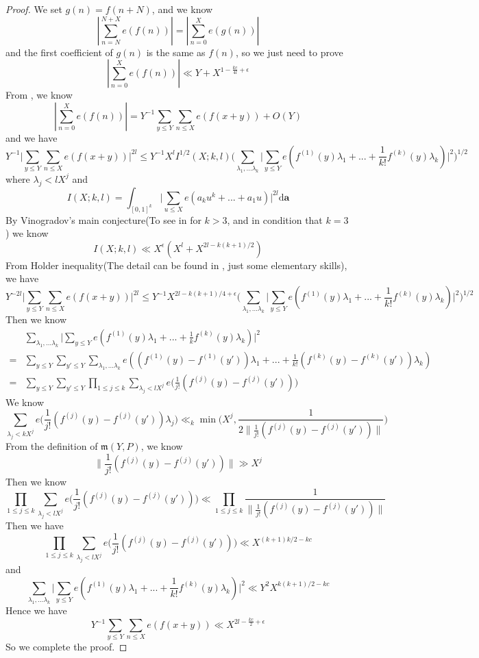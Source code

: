 \documentclass[10pt,a4paper]{amsart}
\begin{document}
\begin{proof}
We set $g(n)=f(n+N)$, and we know
\[
|\sum\limits_{n=N}^{N+X}e(f(n))|=|\sum\limits_{n=0}^{X}e(g(n))|
\]
and the first coefficient of $g(n)$ is the same as $f(n)$, so we just need to prove
\[
|\sum\limits_{n=0}^{X}e(f(n))|\ll Y+X^{1-\frac{kc}{4l}+\epsilon}
\]
From \cite{PP1986}, we know 
\[
|\sum\limits_{n=0}^{X}e(f(n))|=Y^{-1}\sum\limits_{y\leq Y}\sum\limits_{n\leq X}e(f(x+y))+O(Y)
\]
and we have
\[
Y^{-1}\Big|\sum\limits_{y\leq Y}\sum\limits_{n\leq X}e(f(x+y))\Big|^{2l}\leq Y^{-1}X^lI^{1/2}(X;k,l)\Big(\sum\limits_{\lambda_1,...\lambda_k}\big|\sum\limits_{y\leq Y}e(f^{(1)}(y)\lambda_1+...+\frac{1}{k!}f^{(k)}(y)\lambda_k)\big|^2\Big)^{1/2}
\]
where $\lambda_j<lX^j$ and
\[
I(X;k,l)=\int_{[0,1]^k}\bigg|\sum\limits_{u\leq X}e(a_ku^k+...+a_1u)\bigg|^{2l}\mathrm{d}\textbf{a}
\]
By Vinogradov's main conjecture(To see in \cite{bourgain2016proofmainconjecturevinogradovs} for $k>3$, and \cite{wooley2014cubiccasemainconjecture} in condition that $k=3$) we know
\[
I(X;k,l)\ll X^{\epsilon}(X^{l}+X^{2l-k(k+1)/2})
\]
From Holder inequality(The detail can be found in \cite{PP1986}, just some elementary skills), we have
\[
Y^{-2l}\Big|\sum\limits_{y\leq Y}\sum\limits_{n\leq X}e(f(x+y))\Big|^{2l}\leq Y^{-1}X^{2l-k(k+1)/4+\epsilon}\Big(\sum\limits_{\lambda_1,...\lambda_k}\big|\sum\limits_{y\leq Y}e(f^{(1)}(y)\lambda_1+...+\frac{1}{k!}f^{(k)}(y)\lambda_k)\big|^2\Big)^{1/2}
\]
Then we know
\begin{align*}
&\sum\limits_{\lambda_1,...\lambda_k}\big|\sum\limits_{y\leq Y}e(f^{(1)}(y)\lambda_1+...+\frac{1}{k}f^{(k)}(y)\lambda_k)\big|^2\\
=&\sum\limits_{y\leq Y}\sum\limits_{y'\leq Y}\sum\limits_{\lambda_1,...\lambda_k}e((f^{(1)}(y)-f^{(1)}(y'))\lambda_1+...+\frac{1}{k!}(f^{(k)}(y)-f^{(k)}(y'))\lambda_k)\\
=&\sum\limits_{y\leq Y}\sum\limits_{y'\leq Y}\prod\limits_{1\leq j\leq k}\sum\limits_{\lambda_j<lX^j}e\big(\frac{1}{j!}(f^{(j)}(y)-f^{(j)}(y'))\big)
\end{align*}
We know
\[
\sum\limits_{\lambda_j<kX^j}e\big(\frac{1}{j!}(f^{(j)}(y)-f^{(j)}(y'))\lambda_j\big)\ll_k\min\bigg(X^j,\frac{1}{2\|\frac{1}{j!}(f^{(j)}(y)-f^{(j)}(y'))\|}\bigg)
\]
From the definition of $\mathfrak{m}(Y,P)$, we know
\[
\|\frac{1}{j!}(f^{(j)}(y)-f^{(j)}(y'))\|\gg X^{j}
\]
Then we know
\[
\prod\limits_{1\leq j\leq k}\sum\limits_{\lambda_j<lX^j}e\big(\frac{1}{j!}(f^{(j)}(y)-f^{(j)}(y'))\big)\ll\prod\limits_{1\leq j\leq k}\frac{1}{\|\frac{1}{j!}(f^{(j)}(y)-f^{(j)}(y'))\|}
\]
Then we have
\[
\prod\limits_{1\leq j\leq k}\sum\limits_{\lambda_j<lX^j}e\big(\frac{1}{j!}(f^{(j)}(y)-f^{(j)}(y'))\big)\ll X^{(k+1)k/2-kc}
\]
and
\[
\sum\limits_{\lambda_1,...\lambda_k}\big|\sum\limits_{y\leq Y}e(f^{(1)}(y)\lambda_1+...+\frac{1}{k!}f^{(k)}(y)\lambda_k)\big|^2\ll Y^2X^{k(k+1)/2-kc}
\]
Hence we have
\[
Y^{-1}\sum\limits_{y\leq Y}\sum\limits_{n\leq X}e(f(x+y))\ll X^{2l-\frac{kc}{2}+\epsilon}
\]
So we complete the proof.
\end{proof}
\end{document}
